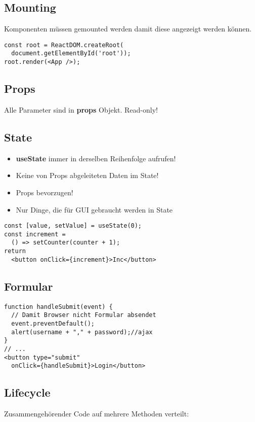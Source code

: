 \begin{multicols*}{4}
\subsection{Mounting}
Komponenten müssen gemounted werden damit diese angezeigt werden können.
\begin{verbatim}
const root = ReactDOM.createRoot(
  document.getElementById('root'));
root.render(<App />);
\end{verbatim}

\subsection{Props}
Alle Parameter sind in \textbf{props} Objekt. Read-only!

\subsection{State}
\begin{itemize}
    \item \textbf{useState} immer in derselben Reihenfolge aufrufen!
    \item Keine von Props abgeleiteten Daten im State!
    \item Props bevorzugen!
    \item Nur Dinge, die für GUI gebraucht werden in State
\end{itemize}

\begin{verbatim}
const [value, setValue] = useState(0);
const increment =
  () => setCounter(counter + 1);
return
  <button onClick={increment}>Inc</button>
\end{verbatim}

\subsection{Formular}
\begin{verbatim}
function handleSubmit(event) {
  // Damit Browser nicht Formular absendet
  event.preventDefault();
  alert(username + "," + password);//ajax
}
// ...
<button type="submit"
  onClick={handleSubmit}>Login</button>
\end{verbatim}

\subsection{Lifecycle}
Zusammengehörender Code auf mehrere Methoden verteilt:


\end{multicols*}
